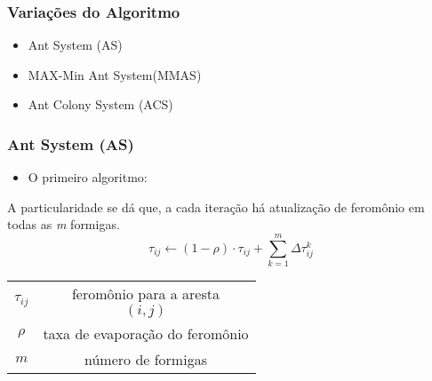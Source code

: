 \documentclass[compress]{beamer}
\begin{document}




 

\begin{frame}
\frametitle{Variações do Algoritmo}

\begin{itemize}
  \item Ant System (AS)
  \item MAX-Min Ant System(MMAS)
  \item Ant Colony System (ACS)
\end{itemize}
\end{frame}

\begin{frame}

\frametitle{Ant System (AS)}

\begin{itemize}
  \item O primeiro algoritmo:
\end{itemize}

 A particularidade se dá que, a cada iteração há atualização de feromônio em todas as  \textit{m} formigas.
$$
\tau_{i j}\leftarrow(1-\rho)\cdot\tau_{i j}+\sum_{k=1}^{m} \Delta\tau_{i j}^{k}	
$$

\begin{center}
\begin{tabular}{ c c } 
 \hline
 $$\tau_{i j}$$ & feromônio para a aresta $$(i,j)$$\\
 $$\rho$$ & taxa de evaporação do feromônio  \\ 
 $$ m $$ & número de formigas \\ 
 \hline
\end{tabular}
\end{center}    


\end{frame}
\end{document}
